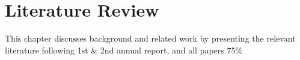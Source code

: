 \chapter{Literature Review}
This chapter discusses background and related work by presenting the relevant literature
following 1st \& 2nd annual report, and all papers
75\%